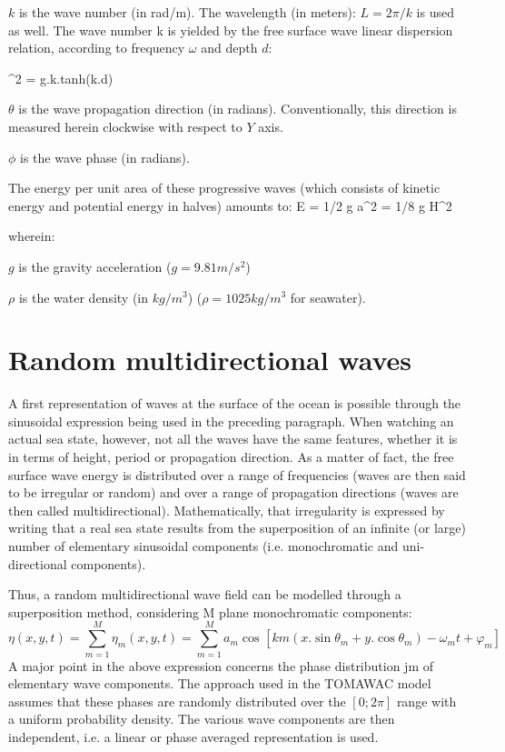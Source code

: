  $k$ is the wave number (in rad/m). The wavelength (in meters): $L = 2\pi/k$ is used as well. The wave number k is yielded by the free surface wave linear dispersion relation, according to frequency $\omega$  and depth $d$:

\bequ
\label{reldisp}
 \omega^2 = g.k.tanh(k.d) 
\eequ

 $\theta$ is the wave propagation direction (in radians). Conventionally, this direction is measured herein clockwise with respect to $Y$ axis.

 $\phi$  is the wave phase (in radians).

 The energy per unit area of these progressive waves (which consists of kinetic energy and potential energy in halves) amounts to:
\bequ
\label{defenergy}
E = 1/2 \rho g a^2 = 1/8 \rho g H^2 
\eequ

 wherein:

 $g$ is the gravity acceleration ($g = 9.81 m/s^{2}$)

 $\rho$ is the water density (in $kg/m^{3}$) ($\rho = 1025 kg/ m^{3}$ for seawater).


\section{ Random multidirectional waves}

 A first representation of waves at the surface of the ocean is possible through the sinusoidal expression being used in the preceding paragraph. When watching an actual sea state, however, not all the waves have the same features, whether it is in terms of height, period or propagation direction. As a matter of fact, the free surface wave energy is distributed over a range of frequencies (waves are then said to be irregular or random) and over a range of propagation directions (waves are then called multidirectional). Mathematically, that irregularity is expressed by writing that a real sea state results from the superposition of an infinite (or large) number of elementary sinusoidal components (i.e. monochromatic and uni-directional components).

 Thus, a random multidirectional wave field can be modelled through a superposition method, considering M plane monochromatic components:
\begin{equation} \label{GrindEQ__2_4_}
\eta (x,y,t)=\sum _{m=1}^{M}\eta _{m}^{}  (x,y,t)=\sum _{m=1}^{M}a_{m}^{} \cos _{}^{}  [km(x.\sin \theta _{m} +y.\cos \theta _{m} )-\omega _{m} t+\varphi _{m} ]
\end{equation}
A major point in the above expression concerns the phase distribution jm of elementary wave components. The approach used in the TOMAWAC model assumes that these phases are randomly distributed over the $[0;2\pi]$ range with a uniform probability density. The various wave components are then independent, i.e. a linear or phase averaged representation is used.

